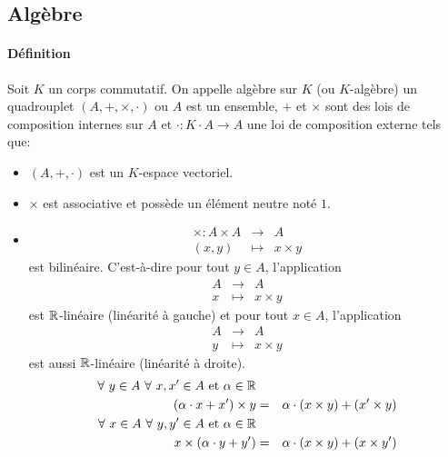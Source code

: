 %
\subsection{Algèbre}
%
\paragraph{Définition} Soit $K$ un corps commutatif. On appelle algèbre sur $K$ (ou $K$-algèbre) un quadrouplet $(A, +, \times, \cdot)$ ou $A$ est un ensemble, $+$ et $\times$ sont des lois de composition internes sur $A$ et $\cdot: K \cdot A \rightarrow A$ une loi de composition externe tels que:
\begin{itemize}
  \item $(A, +, \cdot)$ est un $K$-espace vectoriel.
  \item $\times$ est associative et possède un élément neutre noté $1$.
  \item 
    \begin{eqnarray*}
      \times: A \times A &\rightarrow& A \\
      (x, y) &\mapsto& x \times y
    \end{eqnarray*}
    est bilinéaire. C'est-à-dire pour tout $y \in A$, l'application
      \begin{eqnarray*}
        A &\rightarrow& A \\
        x &\mapsto& x \times y
      \end{eqnarray*}
      est $\mathbb{R}$-linéaire (linéarité à gauche) et pour tout $x \in A$, l'application
      \begin{eqnarray*}
        A &\rightarrow& A \\
        y &\mapsto& x \times y
      \end{eqnarray*}
      est aussi $\mathbb{R}$-linéaire (linéarité à droite).
      \begin{eqnarray*}
        \forall~ y \in A ~\forall~ x, x' \in A ~\text{et}~ \alpha \in \mathbb{R} \\
          (\alpha \cdot x + x') \times y &=& \alpha \cdot (x \times y) + (x' \times y) \\
        \forall~ x \in A ~\forall~ y, y' \in A ~\text{et}~ \alpha \in \mathbb{R} \\
          x \times (\alpha \cdot y + y') &=& \alpha \cdot (x \times y) + (x \times y') \\
      \end{eqnarray*}
\end{itemize}

